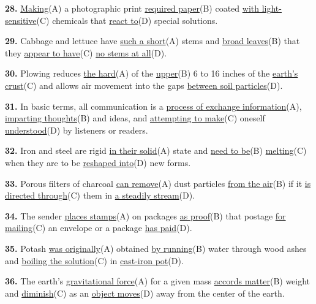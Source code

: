 \documentclass[12pt]{article}
\begin{document}
\par
\vspace{\questionblockgap}
\noindent\textbf{28.} \uline{Making}(A) a photographic print \uline{required paper}(B) coated \uline{with light-sensitive}(C) chemicals that \uline{react to}(D) special solutions.
\par
\vspace{\questionblockgap}
\noindent\textbf{29.} Cabbage and lettuce have \uline{such a short}(A) stems and \uline{broad leaves}(B) that they \uline{appear to have}(C) \uline{no stems at all}(D).
\par
\vspace{\questionblockgap}
\noindent\textbf{30.} Plowing reduces \uline{the hard}(A) of the \uline{upper}(B) 6 to 16 inches of the \uline{earth's crust}(C) and allows air movement into the gaps \uline{between soil particles}(D).
\par
\vspace{\questionblockgap}
\noindent\textbf{31.} In basic terms, all communication is a \uline{process of exchange information}(A), \uline{imparting thoughts}(B) and ideas, and \uline{attempting to make}(C) oneself \uline{understood}(D) by listeners or readers.
\par
\vspace{\questionblockgap}
\noindent\textbf{32.} Iron and steel are rigid \uline{in their solid}(A) state and \uline{need to be}(B) \uline{melting}(C) when they are to be \uline{reshaped into}(D) new forms.
\par
\vspace{\questionblockgap}
\noindent\textbf{33.} Porous filters of charcoal \uline{can remove}(A) dust particles \uline{from the air}(B) if it \uline{is directed through}(C) them in \uline{a steadily stream}(D).
\par
\vspace{\questionblockgap}
\noindent\textbf{34.} The sender \uline{places stamps}(A) on packages \uline{as proof}(B) that postage \uline{for mailing}(C) an envelope or a package \uline{has paid}(D).
\par
\vspace{\questionblockgap}
\noindent\textbf{35.} Potash \uline{was originally}(A) obtained \uline{by running}(B) water through wood ashes and \uline{boiling the solution}(C) in \uline{cast-iron pot}(D).
\par
\vspace{\questionblockgap}
\noindent\textbf{36.} The earth's \uline{gravitational force}(A) for a given mass \uline{accords matter}(B) weight and \uline{diminish}(C) as an \uline{object moves}(D) away from the center of the earth.
\end{document}
